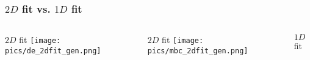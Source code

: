 \documentclass[10 pt,compress,mathserif]{beamer}
\begin{document}
\begin{frame}
 \frametitle{$2D$ fit vs. $1D$ fit}
 \begin{columns}
  \begin{column}{0.33\textwidth}
   \begin{center}
   $2D$ fit
    \texttt{[image: pics/de\_2dfit\_gen.png]}
   \end{center}
  \end{column}
  \begin{column}{0.33\textwidth}
   \begin{center}
   $2D$ fit
    \texttt{[image: pics/mbc\_2dfit\_gen.png]}
   \end{center}
  \end{column}
 \begin{column}{0.33\textwidth}
   \begin{center}
   $1D$ fit
   \end{center}
  \end{column}  
 \end{columns}
 

\end{frame}
\end{document}
